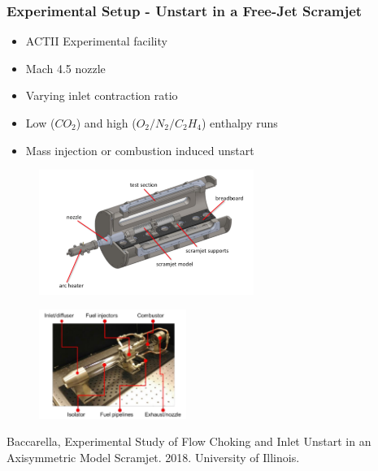 \documentclass{beamer}
\begin{document}
\begin{frame}\frametitle{Experimental Setup - Unstart in a Free-Jet Scramjet}

   \vspace{10pt}
	\begin{minipage}{0.59\textwidth}
	  \begin{itemize}
	    \item ACTII Experimental facility
	    \item Mach 4.5 nozzle
	    \item Varying inlet contraction ratio
	    \item Low ($CO_2$) and high ($O_2/N_2/C_2H_4$) enthalpy runs
	    \item Mass injection or combustion induced unstart
	  \end{itemize}

	  \vspace{-10pt}
	  	\begin{figure}
	  	\centering
	  		\includegraphics[height=1.6in]{Figures/ACTII_testChamber.pdf}
	  	\end{figure}

	\end{minipage}
	\begin{minipage}{0.39\textwidth}
	\begin{figure}
		\centering
	  \includegraphics[height=1.4in]{Figures/scramjetModel.pdf}
	\end{figure}
	
		\begin{singlespace} 
		\tiny Baccarella, Experimental Study of Flow Choking and Inlet Unstart in an Axisymmetric Model Scramjet. 2018. University of Illinois.
		\end{singlespace}
	\end{minipage}


\end{frame}
\end{document}
